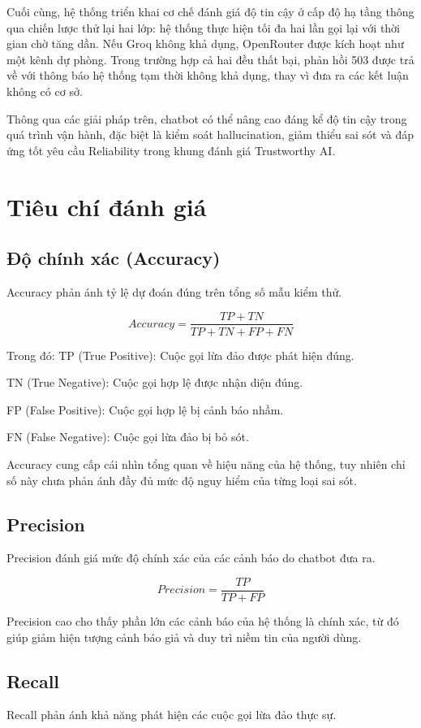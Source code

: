 Cuối cùng, hệ thống triển khai cơ chế đánh giá độ tin cậy ở cấp độ hạ tầng thông qua chiến lược thử lại hai lớp: hệ thống thực hiện tối đa hai lần gọi lại với thời gian chờ tăng dần. Nếu Groq không khả dụng, OpenRouter được kích hoạt như một kênh dự phòng. Trong trường hợp cả hai đều thất bại, phản hồi 503 được trả về với thông báo hệ thống tạm thời không khả dụng, thay vì đưa ra các kết luận không có cơ sở.

Thông qua các giải pháp trên, chatbot có thể nâng cao đáng kể độ tin cậy trong quá trình vận hành, đặc biệt là kiểm soát hallucination, giảm thiểu sai sót và đáp ứng tốt yêu cầu Reliability trong khung đánh giá Trustworthy AI.

\section{Tiêu chí đánh giá}
\subsection{Độ chính xác (Accuracy)}
Accuracy phản ánh tỷ lệ dự đoán đúng trên tổng số mẫu kiểm thử.

\[Accuracy=\frac{TP+TN}{TP+TN+FP+FN}\]

Trong đó:
TP (True Positive): Cuộc gọi lừa đảo được phát hiện đúng.

TN (True Negative): Cuộc gọi hợp lệ được nhận diện đúng.

FP (False Positive): Cuộc gọi hợp lệ bị cảnh báo nhầm.

FN (False Negative): Cuộc gọi lừa đảo bị bỏ sót.

Accuracy cung cấp cái nhìn tổng quan về hiệu năng của hệ thống, tuy nhiên chỉ số này chưa phản ánh đầy đủ mức độ nguy hiểm của từng loại sai sót.

\subsection{Precision}
Precision đánh giá mức độ chính xác của các cảnh báo do chatbot đưa ra.

\[Precision=\frac{TP}{TP+FP}\]

Precision cao cho thấy phần lớn các cảnh báo của hệ thống là chính xác, từ đó giúp giảm hiện tượng cảnh báo giả và duy trì niềm tin của người dùng.

\subsection{Recall}
Recall phản ánh khả năng phát hiện các cuộc gọi lừa đảo thực sự.

